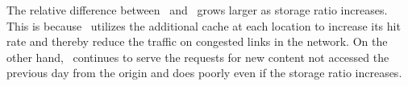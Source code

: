 


%



\eat
{
The relative difference between  \invlru\ and \optrp\ grows larger as storage ratio increases. This is because \invlru\  utilizes the additional cache at each location to increase its hit rate and thereby reduce the traffic on congested links in the network. On the other hand, \optrp\ continues to serve the requests for new content not accessed the previous day from the origin and does poorly even if the storage ratio increases. 
}


